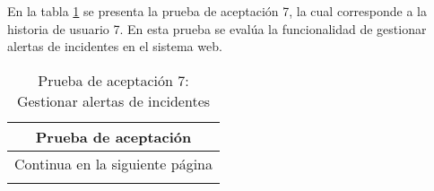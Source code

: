 En la tabla \ref{tab:prueba-7} se presenta la prueba de aceptación 7, la cual corresponde a la historia de usuario 7.
En esta prueba se evalúa la funcionalidad de gestionar alertas de incidentes en el sistema web.

\begin{longtable}{|p{6.7cm}|p{6.7cm}|}
    \caption{Prueba de aceptación 7: Gestionar alertas de incidentes} \label{tab:prueba-7}
    \\
    \hline
    \multicolumn{2}{|c|}{\textbf{Prueba de aceptación}}                                                                                                                                                                                                                                                                            \\
    \hline

    \endfirsthead

    \hline
    \endhead

    \hline
    \multicolumn{2}{|c|}{{Continua en la siguiente página}}                                                                                                                                                                                                                                                                        \\
    \hline
    \endfoot


\end{longtable}
